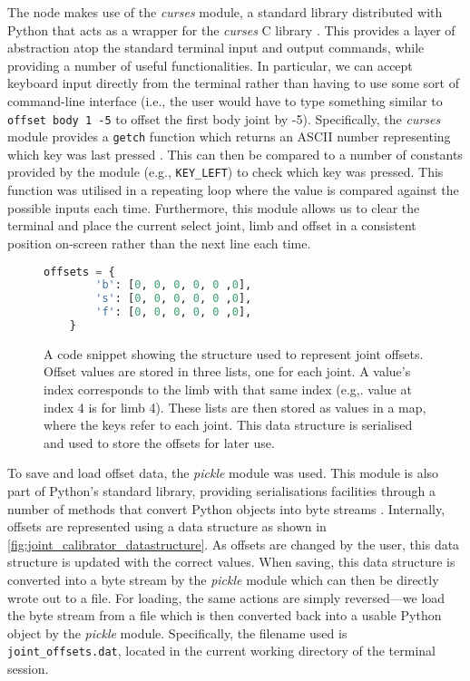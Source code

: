 The node makes use of the \emph{curses} module, a standard library distributed with Python that acts as a wrapper for the \emph{curses} C library \cite{curses}. This provides a layer of abstraction atop the standard terminal input and output commands, while providing a number of useful functionalities. In particular, we can accept keyboard input directly from the terminal rather than having to use some sort of command-line interface (i.e., the user would have to type something similar to \texttt{offset body 1 -5} to offset the first body joint by -5\textdegree{}). Specifically, the \emph{curses} module provides a \texttt{getch} function which returns an ASCII number representing which key was last pressed \cite[User Input]{curses}. This can then be compared to a number of constants provided by the module (e.g., \texttt{KEY\_LEFT}) to check which key was pressed. This function was utilised in a repeating loop where the value is compared against the possible inputs each time. Furthermore, this module allows us to clear the terminal and place the current select joint, limb and offset in a consistent position on-screen rather than the next line each time.

\begin{figure}[!h]
    \centering
	\begin{lstlisting}[language=Python]
	offsets = {
		'b': [0, 0, 0, 0, 0 ,0],
		's': [0, 0, 0, 0, 0 ,0],
		'f': [0, 0, 0, 0, 0 ,0],
	}
	\end{lstlisting}
	\caption{A code snippet showing the structure used to represent joint offsets. Offset values are stored in three lists, one for each joint. A value's index corresponds to the limb with that same index (e.g,. value at index 4 is for limb 4). These lists are then stored as values in a map, where the keys refer to each joint. This data structure is serialised and used to store the offsets for later use.}
	\label{fig:joint_calibrator_datastructure}
\end{figure}

To save and load offset data, the \emph{pickle} module was used. This module is also part of Python's standard library, providing serialisations facilities through a number of methods that convert Python objects into byte streams \cite{pickle}. Internally, offsets are represented using a data structure as shown in \autoref{fig:joint_calibrator_datastructure}. As offsets are changed by the user, this data structure is updated with the correct values. When saving, this data structure is converted into a byte stream by the \emph{pickle} module which can then be directly wrote out to a file. For loading, the same actions are simply reversed---we load the byte stream from a file which is then converted back into a usable Python object by the \emph{pickle} module. Specifically, the filename used is \texttt{joint\_offsets.dat}, located in the current working directory of the terminal session.


